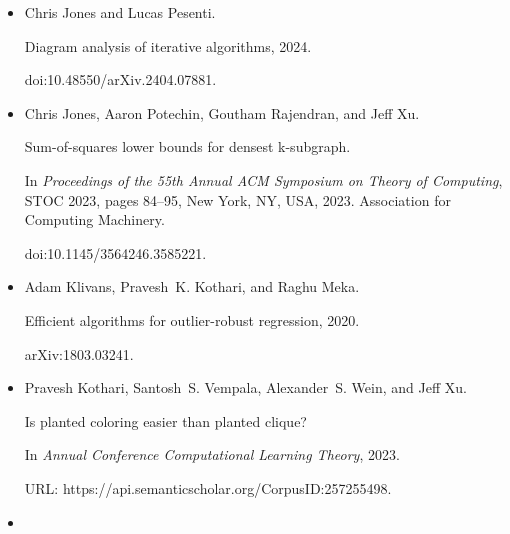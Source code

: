 \begin{itemize}
Sum-of-squares lower bounds for sparse independent set.


In \emph{2021 IEEE 62nd Annual Symposium on Foundations of Computer
Science (FOCS)}, pages 406–416, Los Alamitos, CA, USA, February 2022. IEEE
Computer Society.


doi:10.1109/FOCS52979.2021.00048.





\item[] 
[25]

Chris Jones and Lucas Pesenti.


Diagram analysis of iterative algorithms, 2024.


doi:10.48550/arXiv.2404.07881.





\item[] 
[26]

Chris Jones, Aaron Potechin, Goutham Rajendran, and Jeff Xu.


Sum-of-squares lower bounds for densest k-subgraph.


In \emph{Proceedings of the 55th Annual ACM Symposium on Theory of
Computing}, STOC 2023, pages 84–95, New York, NY, USA, 2023. Association for
Computing Machinery.


doi:10.1145/3564246.3585221.





\item[] 
[27]

Adam Klivans, Pravesh K. Kothari, and Raghu Meka.


Efficient algorithms for outlier-robust regression, 2020.


arXiv:1803.03241.





\item[] 
[28]

Pravesh Kothari, Santosh S. Vempala, Alexander S. Wein, and Jeff Xu.


Is planted coloring easier than planted clique?


In \emph{Annual Conference Computational Learning Theory}, 2023.


URL: https://api.semanticscholar.org/CorpusID:257255498.





\item[] 
[29]


\end{itemize}
